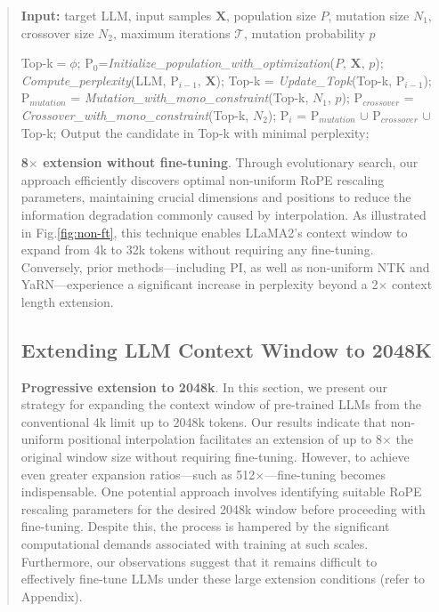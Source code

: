 \begin{abstract}
\begin{algorithm}[t]
	\small
	\caption{The search algorithm}
	\textbf{Input:} target LLM, input samples $\mathbf{X}$, population size $P$, mutation size $N_1$, crossover size $N_2$, maximum iterations $\mathcal{T}$, mutation probability $p$\\

	\begin{algorithmic}[1]
		\label{alg:search}
		\STATE Top-k$=\phi$;	
		\STATE $\text{P}_0$=\textit{Initialize\_population\_with\_optimization}($P$, $\mathbf{X}$, $p$); 
		\STATE \textit{Compute\_perplexity}(LLM, $\text{P}_{i-1}$, $\mathbf{X}$);
		\STATE Top-k = \textit{Update\_Topk}(Top-k, $\text{P}_{i-1}$);
		\STATE $\text{P}_{mutation}$ = \textit{Mutation\_with\_mono\_constraint}(Top-k, $N_1$, $p$);
		\STATE $\text{P}_{crossover}$ = \textit{Crossover\_with\_mono\_constraint}(Top-k, $N_2$);
		\STATE $\text{P}_i$ = $\text{P}_{mutation}$ $\cup$ $\text{P}_{crossover}$ $\cup$ Top-k;
		\ENDFOR
		\STATE Output the candidate in Top-k with minimal perplexity;
	\end{algorithmic}
\end{algorithm}

\textbf{8$\times$ extension without fine-tuning}. Through evolutionary search, our approach efficiently discovers optimal non-uniform RoPE rescaling parameters, maintaining crucial dimensions and positions to reduce the information degradation commonly caused by interpolation. As illustrated in Fig.\ref{fig:non-ft}, this technique enables LLaMA2's context window to expand from 4k to 32k tokens without requiring any fine-tuning. Conversely, prior methods—including PI, as well as non-uniform NTK and YaRN—experience a significant increase in perplexity beyond a 2$\times$ context length extension.

\subsection{Extending LLM Context Window to 2048K}
\label{sec:extendto2048k}

\textbf{Progressive extension to 2048k}. In this section, we present our strategy for expanding the context window of pre-trained LLMs from the conventional 4k limit up to 2048k tokens. Our results indicate that non-uniform positional interpolation facilitates an extension of up to 8$\times$ the original window size without requiring fine-tuning. However, to achieve even greater expansion ratios—such as 512$\times$—fine-tuning becomes indispensable. One potential approach involves identifying suitable RoPE rescaling parameters for the desired 2048k window before proceeding with fine-tuning. Despite this, the process is hampered by the significant computational demands associated with training at such scales. Furthermore, our observations suggest that it remains difficult to effectively fine-tune LLMs under these large extension conditions (refer to Appendix).


\end{abstract}

